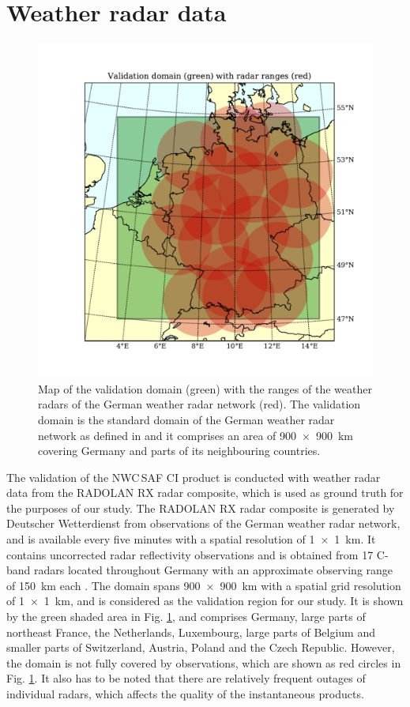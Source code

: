\section{Weather radar data}
\begin{figure}[htbp]
\centering
\includegraphics[width=\textwidth]{Grafiken/Abbildungen/radolan_domain.pdf}
\caption{Map of the validation domain (green) with the ranges of the weather radars of the German weather radar network (red). The validation domain is the standard domain of the German weather radar network as defined in \citet{RADOLANkurz2018} and it comprises an area of \SI{900 x 900}{\kilo\metre} covering Germany and parts of its neighbouring countries.}
\label{fig:radolan_domain}
\end{figure}
The validation of the NWC\,SAF CI product is conducted with weather radar data from the RADOLAN RX radar composite, which is used as ground truth for the purposes of our study. The RADOLAN RX radar composite is generated by Deutscher Wetterdienst from observations of the German weather radar network, and is available every five minutes with a spatial resolution of \SI{1 x 1}{\kilo\metre}.  It contains uncorrected radar reflectivity observations and is obtained from 17 C-band radars located throughout Germany with an approximate observing range of \SI{150}{km} each \citep{RADOLANkurz2018}. The domain spans \SI{900 x 900}{\kilo\metre} with a spatial grid resolution of \SI{1 x 1}{\kilo\metre}, and is considered as the validation region for our study. It is shown by the green shaded area in Fig. \ref{fig:radolan_domain}, and comprises Germany, large parts of northeast France, the Netherlands, Luxembourg, large parts of Belgium and smaller parts of Switzerland, Austria, Poland and the Czech Republic. However, the domain is not fully covered by observations, which are shown as red circles in Fig. \ref{fig:radolan_domain}. It also has to be noted that there are relatively frequent outages of individual radars, which affects the quality of the instantaneous products.

